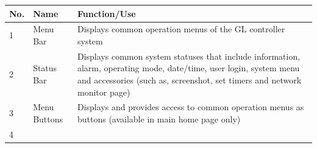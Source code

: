 \begin{longtable}[]{@{}lll@{}}
\toprule
\begin{minipage}[b]{0.04\columnwidth}\raggedright
No.\strut
\end{minipage} & \begin{minipage}[b]{0.23\columnwidth}\raggedright
Name\strut
\end{minipage} & \begin{minipage}[b]{0.65\columnwidth}\raggedright
Function/Use\strut
\end{minipage}\tabularnewline
\midrule
\endhead
\begin{minipage}[t]{0.04\columnwidth}\raggedright
1\strut
\end{minipage} & \begin{minipage}[t]{0.23\columnwidth}\raggedright
Menu Bar\strut
\end{minipage} & \begin{minipage}[t]{0.65\columnwidth}\raggedright
Displays common operation menus of the GL controller system\strut
\end{minipage}\tabularnewline
\begin{minipage}[t]{0.04\columnwidth}\raggedright
2\strut
\end{minipage} & \begin{minipage}[t]{0.23\columnwidth}\raggedright
Status Bar\strut
\end{minipage} & \begin{minipage}[t]{0.65\columnwidth}\raggedright
Displays common system statuses that include information, alarm,
operating mode, date/time, user login, system menu and accessories (such
as, screenshot, set timers and network monitor page)\strut
\end{minipage}\tabularnewline
\begin{minipage}[t]{0.04\columnwidth}\raggedright
3\strut
\end{minipage} & \begin{minipage}[t]{0.23\columnwidth}\raggedright
Menu Buttons\strut
\end{minipage} & \begin{minipage}[t]{0.65\columnwidth}\raggedright
Displays and provides access to common operation menus as buttons
(available in main home page only)\strut
\end{minipage}\tabularnewline
\begin{minipage}[t]{0.04\columnwidth}\raggedright
4\strut
\end{minipage} & \begin{minipage}[t]{0.23\columnwidth}\raggedright

\end{minipage}
\end{longtable}
